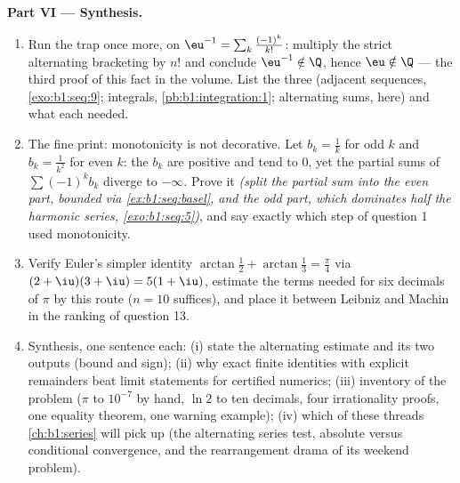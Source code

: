 \begin{problem}
\medskip
\noindent\textbf{Part VI --- Synthesis.}
\begin{enumerate}[resume]
  \item Run the trap once more, on $\eu^{-1} = \sum_k
        \frac{(-1)^k}{k!}$: multiply the strict alternating
        bracketing by $n!$ and conclude $\eu^{-1} \notin \Q$,
        hence $\eu \notin \Q$ --- the third proof of this fact
        in the volume. List the three (adjacent sequences,
        \cref{exo:b1:seq:9}; integrals,
        \cref{pb:b1:integration:1}; alternating sums, here) and
        what each needed.
  \item The fine print: monotonicity is not decorative. Let
        $b_k = \frac1k$ for odd $k$ and $b_k = \frac{1}{k^2}$
        for even $k$: the $b_k$ are positive and tend to $0$,
        yet the partial sums of $\sum (-1)^k b_k$ diverge to
        $-\infty$. Prove it \emph{(split the partial sum into
        the even part, bounded via
        \cref{ex:b1:seq:basel}, and the odd part, which
        dominates half the harmonic series,
        \cref{exo:b1:seq:5})}, and say exactly which step of
        question 1 used monotonicity.
  \item Verify Euler's simpler identity $\arctan\frac12 +
        \arctan\frac13 = \frac\pi4$ via $(2 + \iu)(3 + \iu) =
        5(1 + \iu)$, estimate the terms needed for six decimals
        of $\pi$ by this route ($n = 10$ suffices), and place it
        between Leibniz and Machin in the ranking of question
        13.
  \item Synthesis, one sentence each: (i) state the alternating
        estimate and its two outputs (bound and sign); (ii) why
        exact finite identities with explicit remainders beat
        limit statements for certified numerics; (iii) inventory
        of the problem ($\pi$ to $10^{-7}$ by hand, $\ln 2$ to
        ten decimals, four irrationality proofs, one equality
        theorem, one warning example); (iv) which of these
        threads \cref{ch:b1:series} will pick up (the alternating
        series test, absolute versus conditional convergence,
        and the rearrangement drama of its weekend problem).
\end{enumerate}
\end{problem}
